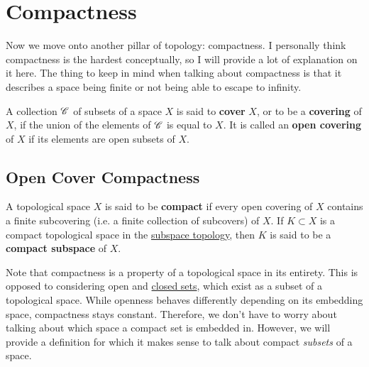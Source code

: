 \section{Compactness} 

  Now we move onto another pillar of topology: compactness. I personally think compactness is the hardest conceptually, so I will provide a lot of explanation on it here. The thing to keep in mind when talking about compactness is that it describes a space being finite or not being able to escape to infinity.  

  \begin{definition}[Covers]
    \label{def:covers}
    A collection $\operatorname{\mathscr{C}}$ of subsets of a space $X$ is said to \textbf{cover} $X$, or to be a \textbf{covering} of $X$, if the union of the elements of $\operatorname{\mathscr{C}}$ is equal to $X$. It is called an \textbf{open covering} of $X$ if its elements are open subsets of $X$. 
  \end{definition}

\subsection{Open Cover Compactness}
  
  \begin{definition}
    \label{def:compact-space}
    A topological space $X$ is said to be \textbf{compact} if every open covering of $X$ contains a finite subcovering (i.e. a finite collection of subcovers) of $X$. If $K \subset X$ is a compact topological space in the \hyperref[def:subspace-topology]{subspace topology}, then $K$ is said to be a \textbf{compact subspace} of $X$. 
  \end{definition}

  Note that compactness is a property of a topological space in its entirety. This is opposed to considering open and \hyperref[def:closed]{closed sets}, which exist as a subset of a topological space. While openness behaves differently depending on its embedding space, compactness stays constant. Therefore, we don't have to worry about talking about which space a compact set is embedded in. However, we will provide a definition for which it makes sense to talk about compact \textit{subsets} of a space. 

